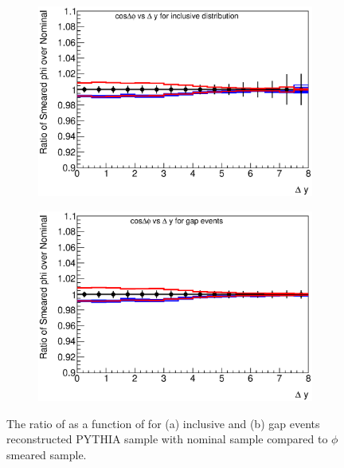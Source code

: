 \begin{figure}
\centering
        \begin{subfigure}[b]{0.5\textwidth}
                \centering
                \includegraphics[width=\textwidth]{figures/GBJ2/ResoPhi/RMS_phi___cosdPhi_deltaY_Ratio.eps}
        \end{subfigure}%
        \begin{subfigure}[b]{0.5\textwidth}
                \centering
                \includegraphics[width=\textwidth]{figures/GBJ2/ResoPhi/RMS_phi___cosdPhi_deltaY_gap_Ratio.eps}
        \end{subfigure}%

\caption[Uncertainty bands due to the jet $\phi$ resolution for \mean{\cosdphi{}}]{
The ratio of \mean{\cosdphi{}} as a function of \dy{} for (a) inclusive and (b) gap events reconstructed PYTHIA sample with nominal sample compared to $\phi$ smeared sample.
\label{GBJ2:ResoPhi:cos}}
\end{figure}

